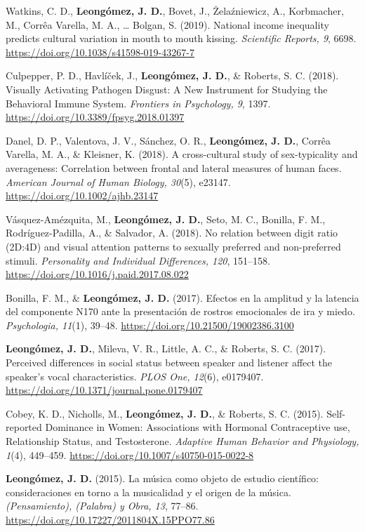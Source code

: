 \documentclass[11pt,a4paper,]{awesome-cv}
\begin{document}
Watkins, C. D., \textbf{Leongómez, J. D.}, Bovet, J., Żelaźniewicz, A.,
Korbmacher, M., Corrêa Varella, M. A., \ldots{} Bolgan, S. (2019).
National income inequality predicts cultural variation in mouth to mouth
kissing. \emph{Scientific Reports, 9}, 6698.
\url{https://doi.org/10.1038/s41598-019-43267-7}

Culpepper, P. D., Havlíček, J., \textbf{Leongómez, J. D.}, \& Roberts,
S. C. (2018). Visually Activating Pathogen Disgust: A New Instrument for
Studying the Behavioral Immune System. \emph{Frontiers in Psychology,
9}, 1397. \url{https://doi.org/10.3389/fpsyg.2018.01397}

Danel, D. P., Valentova, J. V., Sánchez, O. R.,
\textbf{Leongómez, J. D.}, Corrêa Varella, M. A., \& Kleisner, K.
(2018). A cross-cultural study of sex-typicality and averageness:
Correlation between frontal and lateral measures of human faces.
\emph{American Journal of Human Biology, 30}(5), e23147.
\url{https://doi.org/10.1002/ajhb.23147}

Vásquez-Amézquita, M., \textbf{Leongómez, J. D.}, Seto, M. C., Bonilla,
F. M., Rodríguez-Padilla, A., \& Salvador, A. (2018). No relation
between digit ratio (2D:4D) and visual attention patterns to sexually
preferred and non-preferred stimuli. \emph{Personality and Individual
Differences, 120}, 151--158.
\url{https://doi.org/10.1016/j.paid.2017.08.022}

Bonilla, F. M., \& \textbf{Leongómez, J. D.} (2017). Efectos en la
amplitud y la latencia del componente N170 ante la presentación de
rostros emocionales de ira y miedo. \emph{Psychologia, 11}(1), 39--48.
\url{https://doi.org/10.21500/19002386.3100}

\textbf{Leongómez, J. D.}, Mileva, V. R., Little, A. C., \& Roberts, S.
C. (2017). Perceived differences in social status between speaker and
listener affect the speaker's vocal characteristics. \emph{PLOS One,
12}(6), e0179407. \url{https://doi.org/10.1371/journal.pone.0179407}

Cobey, K. D., Nicholls, M., \textbf{Leongómez, J. D.}, \& Roberts, S. C.
(2015). Self-reported Dominance in Women: Associations with Hormonal
Contraceptive use, Relationship Status, and Testosterone. \emph{Adaptive
Human Behavior and Physiology, 1}(4), 449--459.
\url{https://doi.org/10.1007/s40750-015-0022-8}

\textbf{Leongómez, J. D.} (2015). La música como objeto de estudio
científico: consideraciones en torno a la musicalidad y el origen de la
música. \emph{(Pensamiento), (Palabra) y Obra, 13}, 77--86.
\url{https://doi.org/10.17227/2011804X.15PPO77.86}
\end{document}
